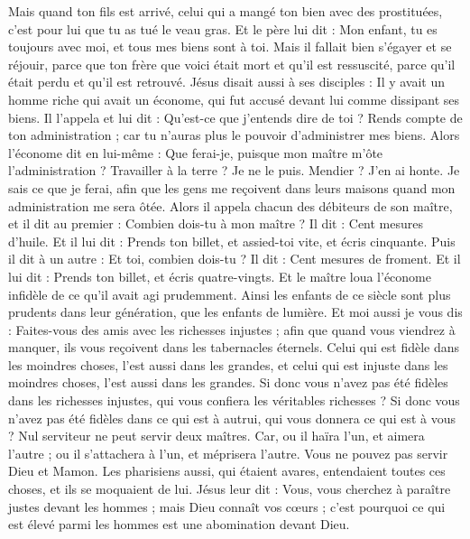 \begin{multicols}{2}
Mais quand ton fils est arrivé, celui qui a mangé ton bien avec des prostituées, c’est pour lui que tu as tué le veau gras.
Et le père lui dit : Mon enfant, tu es toujours avec moi, et tous mes biens sont à toi.
Mais il fallait bien s’égayer et se réjouir, parce que ton frère que voici était mort et qu’il est ressuscité, parce qu’il était perdu et qu’il est retrouvé.
\VerseOne{}Jésus disait aussi à ses disciples : Il y avait un homme riche qui avait un économe, qui fut accusé devant lui comme dissipant ses biens.
Il l’appela et lui dit : Qu’est-ce que j'entends dire de toi ? Rends compte de ton administration ; car tu n'auras plus le pouvoir d'administrer mes biens.
Alors l'économe dit en lui-même : Que ferai-je, puisque mon maître m'ôte l'administration ? Travailler à la terre ? Je ne le puis. Mendier ? J’en ai honte.
Je sais ce que je ferai, afin que les gens me reçoivent dans leurs maisons quand mon administration me sera ôtée.
Alors il appela chacun des débiteurs de son maître, et il dit au premier : Combien dois-tu à mon maître ?
Il dit : Cent mesures d'huile. Et il lui dit : Prends ton billet, et assied-toi vite, et écris cinquante.
Puis il dit à un autre : Et toi, combien dois-tu ? Il dit : Cent mesures de froment. Et il lui dit : Prends ton billet, et écris quatre-vingts.
Et le maître loua l'économe infidèle de ce qu'il avait agi prudemment. Ainsi les enfants de ce siècle sont plus prudents dans leur génération, que les enfants de lumière.
Et moi aussi je vous dis : Faites-vous des amis avec les richesses injustes ; afin que quand vous viendrez à manquer, ils vous reçoivent dans les tabernacles éternels.
Celui qui est fidèle dans les moindres choses, l’est aussi dans les grandes, et celui qui est injuste dans les moindres choses, l’est aussi dans les grandes.
Si donc vous n'avez pas été fidèles dans les richesses injustes, qui vous confiera les véritables richesses ?
Si donc vous n’avez pas été fidèles dans ce qui est à autrui, qui vous donnera ce qui est à vous ?
Nul serviteur ne peut servir deux maîtres. Car, ou il haïra l'un, et aimera l'autre ; ou il s'attachera à l'un, et méprisera l'autre. Vous ne pouvez pas servir Dieu et Mamon.
Les pharisiens aussi, qui étaient avares, entendaient toutes ces choses, et ils se moquaient de lui.
Jésus leur dit : Vous, vous cherchez à paraître justes devant les hommes ; mais Dieu connaît vos cœurs ; c'est pourquoi ce qui est élevé parmi les hommes est une abomination devant Dieu.

\end{multicols}
